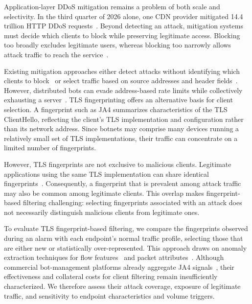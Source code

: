 \documentclass[conference,letterpaper,10pt]{IEEEtran}
\newcommand\1{\textit{(i)}}
\newcommand\2{\textit{(ii)}}
\newcommand\3{\textit{(iii)}}
\newcommand\4{\textit{(iv)}}
\newcommand\5{\textit{(v)}}
\newcommand\6{\textit{(vi)}}
\newcommand\7{\textit{(vii)}}
\newcommand\8{\textit{(viii)}}
\newcommand\9{\textit{(ix)}}
\begin{document}
Application-layer DDoS mitigation remains a problem of both scale and selectivity. In the third quarter of 2026 alone, one CDN provider mitigated 14.4 trillion HTTP DDoS requests~\cite{cloudflare2026q3ddos}. Beyond detecting an attack, mitigation systems must decide which clients to block while preserving legitimate access. Blocking too broadly excludes legitimate users, whereas blocking too narrowly allows attack traffic to reach the service~\cite{soldo2012filtering,dietzel2018stellar}.

Existing mitigation approaches either detect attacks without identifying which clients to block~\cite{tripathi2021application,belcastro2025klage} or select traffic based on source addresses and header fields~\cite{soldo2012filtering,mahajan2002pushback,alcoz2022accturbo}. However, distributed bots can evade address-based rate limits while collectively exhausting a server~\cite{cambiaso2013slowdos}. TLS fingerprinting offers an alternative basis for client selection. A fingerprint such as JA4 summarizes characteristics of the TLS ClientHello, reflecting the client's TLS implementation and configuration rather than its network address. Since botnets may comprise many devices running a relatively small set of TLS implementations, their traffic can concentrate on a limited number of fingerprints. 

However, TLS fingerprints are not exclusive to malicious clients. Legitimate applications using the same TLS implementation can share identical fingerprints~\cite{anderson2019tls}. Consequently, a fingerprint that is prevalent among attack traffic may also be common among legitimate clients. This overlap makes fingerprint-based filtering challenging: selecting fingerprints associated with an attack does not necessarily distinguish malicious clients from legitimate ones.

To evaluate TLS fingerprint-based filtering, we compare the fingerprints observed during an alarm with each endpoint's normal traffic profile, selecting those that are either new or statistically over-represented. This approach draws on anomaly extraction techniques for flow features~\cite{silveira2010urca,brauckhoff2009extraction} and packet attributes~\cite{kim2006packetscore}. Although commercial bot-management platforms already aggregate JA4 signals~\cite{martinetti2024ja4signals}, their effectiveness and collateral costs for client filtering remain insufficiently characterized. We therefore assess their attack coverage, exposure of legitimate traffic, and sensitivity to endpoint characteristics and volume triggers.
\end{document}
